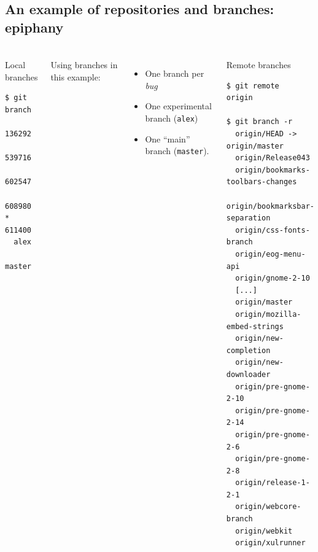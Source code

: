 
\subsection{An example of repositories and branches: epiphany}

\begin{frame}[fragile]
  \frametitle{\insertsubsection}

  \begin{columns}[t]
    \begin{block}{Local branches}
      \begin{tiny}
\begin{verbatim}
$ git branch
  136292
  539716
  602547
  608980
* 611400
  alex
  master
\end{verbatim}
\end{tiny}
    \end{block} \vspacing
    Using branches in this example:
    \begin{itemize}
    \item One branch per \textit{bug} \vspacing

    \item One experimental branch (\texttt{alex}) \vspacing

    \item One ``main'' branch (\texttt{master}).
    \end{itemize}

    \begin{block}{Remote branches}
      \begin{tiny}
\begin{verbatim}
$ git remote 
origin

$ git branch -r
  origin/HEAD -> origin/master
  origin/Release043
  origin/bookmarks-toolbars-changes
  origin/bookmarksbar-separation
  origin/css-fonts-branch
  origin/eog-menu-api
  origin/gnome-2-10
  [...]
  origin/master
  origin/mozilla-embed-strings
  origin/new-completion
  origin/new-downloader
  origin/pre-gnome-2-10
  origin/pre-gnome-2-14
  origin/pre-gnome-2-6
  origin/pre-gnome-2-8
  origin/release-1-2-1
  origin/webcore-branch
  origin/webkit
  origin/xulrunner
\end{verbatim}
\end{tiny}
    \end{block}
\end{columns}
\end{frame}

